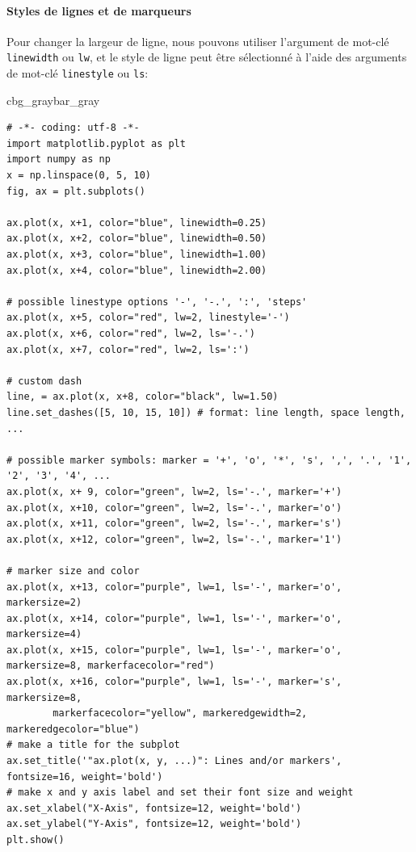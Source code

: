 \documentclass[%
oneside,                 %
final,                   %
10pt,french]{article}
\newenvironment{_pro_tight}[2]{
   \def\FrameCommand{\color{#2}\vrule width 1mm\normalcolor\colorbox{#1}}
   \FrameRule0.6pt\MakeFramed {\advance\hsize-2mm\FrameRestore}\vskip3mm}
   {\vskip0mm\endMakeFramed}
\newenvironment{pro}[2]{
\bgroup\rmfamily
\fboxsep=0mm\relax
\begin{_pro_tight}{#1}{#2}
\list{}{\parsep=-2mm\parskip=0mm\topsep=0pt\leftmargin=2mm
\rightmargin=2\leftmargin\leftmargin=4pt\relax}
\item\relax}
{\endlist\end{_pro_tight}\egroup}
\begin{document}
\paragraph{Styles de lignes et de marqueurs}
Pour changer la largeur de ligne, nous pouvons utiliser l'argument de mot-clé \texttt{linewidth} ou \texttt{lw}, et le style de ligne peut être sélectionné à l'aide des arguments de mot-clé \texttt{linestyle} ou \texttt{ls}:

\begin{pro}{cbg_gray}{bar_gray}\begin{verbatim}
# -*- coding: utf-8 -*-
import matplotlib.pyplot as plt
import numpy as np
x = np.linspace(0, 5, 10)
fig, ax = plt.subplots()

ax.plot(x, x+1, color="blue", linewidth=0.25)
ax.plot(x, x+2, color="blue", linewidth=0.50)
ax.plot(x, x+3, color="blue", linewidth=1.00)
ax.plot(x, x+4, color="blue", linewidth=2.00)

# possible linestype options '-', '-.', ':', 'steps'
ax.plot(x, x+5, color="red", lw=2, linestyle='-')
ax.plot(x, x+6, color="red", lw=2, ls='-.')
ax.plot(x, x+7, color="red", lw=2, ls=':')

# custom dash
line, = ax.plot(x, x+8, color="black", lw=1.50)
line.set_dashes([5, 10, 15, 10]) # format: line length, space length, ...

# possible marker symbols: marker = '+', 'o', '*', 's', ',', '.', '1', '2', '3', '4', ...
ax.plot(x, x+ 9, color="green", lw=2, ls='-.', marker='+')
ax.plot(x, x+10, color="green", lw=2, ls='-.', marker='o')
ax.plot(x, x+11, color="green", lw=2, ls='-.', marker='s')
ax.plot(x, x+12, color="green", lw=2, ls='-.', marker='1')

# marker size and color
ax.plot(x, x+13, color="purple", lw=1, ls='-', marker='o', markersize=2)
ax.plot(x, x+14, color="purple", lw=1, ls='-', marker='o', markersize=4)
ax.plot(x, x+15, color="purple", lw=1, ls='-', marker='o', markersize=8, markerfacecolor="red")
ax.plot(x, x+16, color="purple", lw=1, ls='-', marker='s', markersize=8, 
        markerfacecolor="yellow", markeredgewidth=2, markeredgecolor="blue")
# make a title for the subplot
ax.set_title('"ax.plot(x, y, ...)": Lines and/or markers', fontsize=16, weight='bold')
# make x and y axis label and set their font size and weight
ax.set_xlabel("X-Axis", fontsize=12, weight='bold')
ax.set_ylabel("Y-Axis", fontsize=12, weight='bold')
plt.show()
\end{verbatim}
\end{pro}
\noindent
\end{document}
